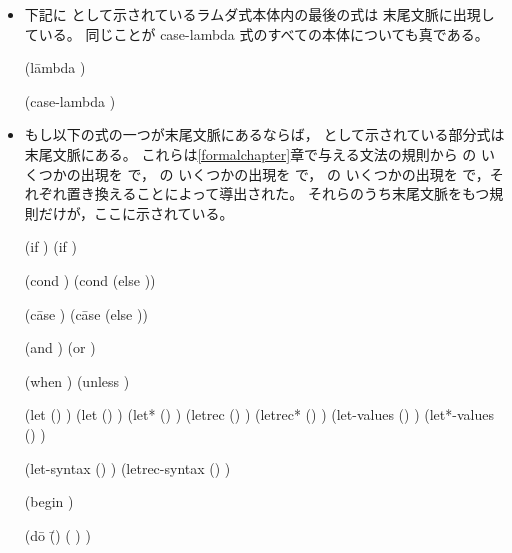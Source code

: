 \begin{itemize}
\item 下記に  として示されているラムダ式本体内の最後の式は
末尾文脈に出現している。
  同じことが {\cf case-lambda} 式のすべての本体についても真である。

\begin{grammar}%
(l\=ambda 
  \>  )

(case-lambda )
\end{grammar}%

\item もし以下の式の一つが末尾文脈にあるならば，
 として示されている部分式は末尾文脈にある。
これらは\ref{formalchapter}章で与える文法の規則から  の
いくつかの出現を  で，  の
いくつかの出現を  で，  の
いくつかの出現を  で，それぞれ置き換えることによって導出された。
それらのうち末尾文脈をもつ規則だけが，ここに示されている。

\begin{grammar}%
(if   )
(if  )

(cond )
(cond  (else ))

(c\=ase 
  \>)
(c\=ase 
  \>
  \>(else ))

(and  )
(or  )

(when  )
(unless  )

(let () )
(let  () )
(let* () )
(letrec () )
(letrec* () )
(let-values () )
(let*-values () )

(let-syntax () )
(letrec-syntax () )

(begin )

(d\=o \=()
  \>  \>( )
  \>)


\end{grammar}
\end{itemize}
